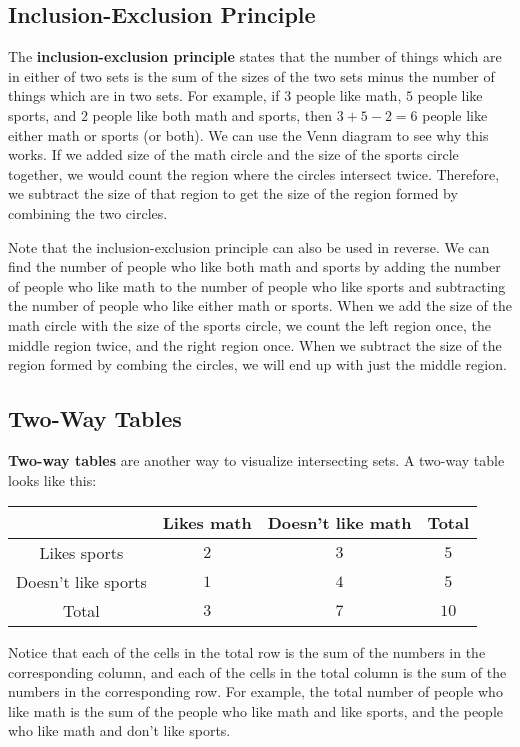 \documentclass[twocolumn]{article}
\begin{document}
\subsection*{Inclusion-Exclusion Principle}
The \textbf{inclusion-exclusion principle} states that the number of things 
which are in either of two sets is the sum of the sizes of the two sets minus 
the number of things which are in two sets. For example, if $3$ people like 
math, $5$ people like sports, and $2$ people like both math and sports, then $3 
+ 5 - 2 = 6$ people like either math or sports (or both). We can use the Venn 
diagram to see why this works. If we added size of the math circle and the size 
of the sports circle together, we would count the region where the circles 
intersect twice. Therefore, we subtract the size of that region to get the size 
of the region formed by combining the two circles.

Note that the inclusion-exclusion principle can also be used in reverse. We can 
find the number of people who like both math and sports by adding the number of 
people who like math to the number of people who like sports and subtracting the 
number of people who like either math or sports. When we add the size of the 
math circle with the size of the sports circle, we count the left region once, 
the middle region twice, and the right region once. When we subtract the size of 
the region formed by combing the circles, we will end up with just the middle 
region.

\subsection*{Two-Way Tables}
\textbf{Two-way tables} are another way to visualize intersecting sets. A 
two-way table looks like this:
\begin{center}
	\begin{tabular}{| c | c | c | c |}
		\hline
		& Likes math & Doesn't like math & Total \\
		\hline
		Likes sports & $2$ & $3$ & $5$ \\
		\hline
		Doesn't like sports & $1$ & $4$ & $5$ \\
		\hline
		Total & $3$ & $7$ & $10$ \\
		\hline
	\end{tabular}
\end{center}

Notice that each of the cells in the total row is the sum of the numbers in the 
corresponding column, and each of the cells in the total column is the sum of 
the numbers in the corresponding row. For example, the total number of people 
who like math is the sum of the people who like math and like sports, and the 
people who like math and don't like sports.
\end{document}
